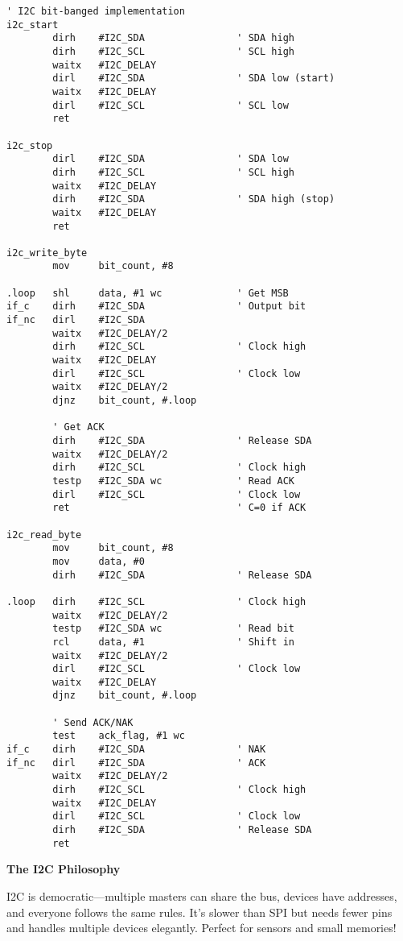 \documentclass[11pt]{book}
\begin{document}
\begin{lstlisting}
' I2C bit-banged implementation
i2c_start
        dirh    #I2C_SDA                ' SDA high
        dirh    #I2C_SCL                ' SCL high
        waitx   #I2C_DELAY
        dirl    #I2C_SDA                ' SDA low (start)
        waitx   #I2C_DELAY
        dirl    #I2C_SCL                ' SCL low
        ret

i2c_stop
        dirl    #I2C_SDA                ' SDA low
        dirh    #I2C_SCL                ' SCL high
        waitx   #I2C_DELAY
        dirh    #I2C_SDA                ' SDA high (stop)
        waitx   #I2C_DELAY
        ret

i2c_write_byte
        mov     bit_count, #8
        
.loop   shl     data, #1 wc             ' Get MSB
if_c    dirh    #I2C_SDA                ' Output bit
if_nc   dirl    #I2C_SDA
        waitx   #I2C_DELAY/2
        dirh    #I2C_SCL                ' Clock high
        waitx   #I2C_DELAY
        dirl    #I2C_SCL                ' Clock low
        waitx   #I2C_DELAY/2
        djnz    bit_count, #.loop
        
        ' Get ACK
        dirh    #I2C_SDA                ' Release SDA
        waitx   #I2C_DELAY/2
        dirh    #I2C_SCL                ' Clock high
        testp   #I2C_SDA wc             ' Read ACK
        dirl    #I2C_SCL                ' Clock low
        ret                             ' C=0 if ACK

i2c_read_byte
        mov     bit_count, #8
        mov     data, #0
        dirh    #I2C_SDA                ' Release SDA
        
.loop   dirh    #I2C_SCL                ' Clock high
        waitx   #I2C_DELAY/2
        testp   #I2C_SDA wc             ' Read bit
        rcl     data, #1                ' Shift in
        waitx   #I2C_DELAY/2
        dirl    #I2C_SCL                ' Clock low
        waitx   #I2C_DELAY
        djnz    bit_count, #.loop
        
        ' Send ACK/NAK
        test    ack_flag, #1 wc
if_c    dirh    #I2C_SDA                ' NAK
if_nc   dirl    #I2C_SDA                ' ACK
        waitx   #I2C_DELAY/2
        dirh    #I2C_SCL                ' Clock high
        waitx   #I2C_DELAY
        dirl    #I2C_SCL                ' Clock low
        dirh    #I2C_SDA                ' Release SDA
        ret
\end{lstlisting}

\begin{interlude}
\textbf{The I2C Philosophy}

I2C is democratic—multiple masters can share the bus, devices have addresses, and everyone follows the same rules. It's slower than SPI but needs fewer pins and handles multiple devices elegantly. Perfect for sensors and small memories!
\end{interlude}
\end{document}
